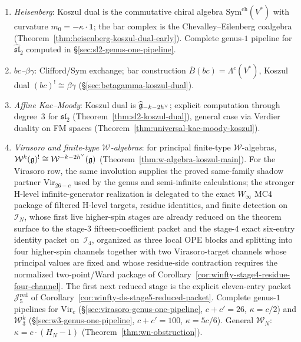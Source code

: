 \begin{enumerate}[label=(\roman*)]
\item \emph{Heisenberg}: Koszul dual is the commutative chiral algebra
$\mathrm{Sym}^{\mathrm{ch}}(V^*)$ with curvature $m_0 = -\kappa \cdot \mathbf{1}$;
the bar complex is the Chevalley--Eilenberg coalgebra
(Theorem~\ref{thm:heisenberg-koszul-dual-early}).
Complete genus-$1$ pipeline for $\widehat{\mathfrak{sl}}_2$ computed
in \S\ref{sec:sl2-genus-one-pipeline}.
\item \emph{$bc$--$\beta\gamma$}: Clifford/Sym exchange;
bar construction $\bar{B}(bc) = \Lambda^c(V^*)$, Koszul dual
$(bc)^! \cong \beta\gamma$
(\S\ref{sec:betagamma-koszul-dual}).
\item \emph{Affine Kac--Moody}: Koszul dual is
$\widehat{\mathfrak{g}}_{-k-2h^\vee}$; explicit computation through degree~$3$
for $\mathfrak{sl}_2$ (Theorem~\ref{thm:sl2-koszul-dual}),
general case via Verdier duality on FM spaces
(Theorem~\ref{thm:universal-kac-moody-koszul}).
\item \emph{Virasoro and finite-type $\mathcal{W}$-algebras}:
for principal finite-type $\mathcal{W}$-algebras,
$\mathcal{W}^k(\mathfrak{g})^! \cong \mathcal{W}^{-k-2h^\vee}(\mathfrak{g})$
(Theorem~\ref{thm:w-algebra-koszul-main}).
For the Virasoro row, the same involution supplies the proved
same-family shadow partner $\mathrm{Vir}_{26-c}$ used by the
genus and semi-infinite calculations; the stronger H-level
infinite-generator realization is delegated to the exact
$W_\infty$ MC4 package of filtered H-level targets, residue identities,
and finite detection on $\mathcal{I}_N$, whose first live
higher-spin stages are already reduced on the theorem surface to the
stage-$3$ fifteen-coefficient packet and the stage-$4$
exact six-entry identity packet on~$\mathcal{I}_4$, organized as three
local OPE blocks and splitting into four higher-spin channels together
with two Virasoro-target channels whose principal values are fixed and
whose residue-side contraction requires the normalized two-point/Ward
package of Corollary~\ref{cor:winfty-stage4-residue-four-channel}.  The
first next reduced stage is the explicit eleven-entry packet
$\mathcal{J}_5^{\mathrm{red}}$ of
Corollary~\ref{cor:winfty-ds-stage5-reduced-packet}.
Complete genus-$1$ pipelines for $\mathrm{Vir}_c$
(\S\ref{sec:virasoro-genus-one-pipeline}, $c + c' = 26$, $\kappa = c/2$)
and $\mathcal{W}_3^k$
(\S\ref{sec:w3-genus-one-pipeline}, $c + c' = 100$, $\kappa = 5c/6$).
General $\mathcal{W}_N$: $\kappa = c \cdot (H_N - 1)$
(Theorem~\ref{thm:wn-obstruction}).
\end{enumerate}

